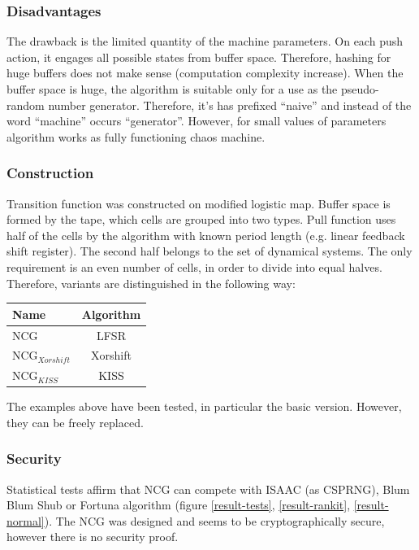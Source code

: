 \documentclass[twocolumn, a4paper, 10pt]{article}
\begin{document}
\subsubsection{Disadvantages}

The drawback is the limited quantity of the machine parameters. On each push action, it engages all possible states from buffer space. Therefore, hashing for huge buffers does not make sense (computation complexity increase). When the buffer space is huge, the algorithm is suitable only for a use as the pseudo-random number generator. Therefore, it's has prefixed ``naive'' and instead of the word ``machine'' occurs ``generator''. However, for small values of parameters algorithm works as fully functioning chaos machine.

\subsubsection{Construction}

Transition function was constructed on modified logistic map. Buffer space is formed by the tape, which cells are grouped into two types. Pull function uses half of the cells by the algorithm with known period length (e.g. linear feedback shift register). The second half belongs to the set of dynamical systems. The only requirement is an even number of cells, in order to divide into equal halves. Therefore, variants are distinguished in the following way:

\begin{center}
  \begin{tabular}{lc}
    Name                         & Algorithm \\
    \hline
    $\text{NCG}$                 & LFSR  \\
    $\text{NCG}_{Xorshift}$      & Xorshift \\
    $\text{NCG}_{KISS}$          & KISS
  \end{tabular}
\end{center}

The examples above have been tested, in particular the basic version. However, they can be freely replaced.

\subsubsection{Security}

Statistical tests affirm that NCG can compete with ISAAC (as CSPRNG), Blum Blum Shub or Fortuna algorithm (figure \ref{result-tests}, \ref{result-rankit}, \ref{result-normal}). The NCG was designed and seems to be cryptographically secure, however there is no security proof.
\end{document}
